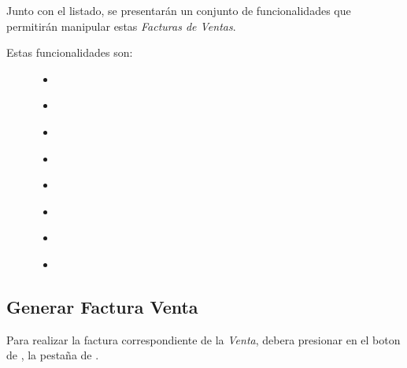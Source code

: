 \documentclass[a4paper,10pt,spanish]{sphinxmanual}
\begin{document}
Junto con el listado, se presentarán un conjunto de funcionalidades que permitirán manipular estas \emph{Facturas de Ventas}.
\begin{description}
\item[{Estas funcionalidades son:}] \leavevmode\begin{itemize}
\item {} 
{\hyperref[ventas:generar\string-factura\string-venta]{}}

\item {} 
{\hyperref[ventas:ver\string-facturas\string-emit]{}}

\item {} 
{\hyperref[ventas:imprimir]{}}

\item {} 
{\hyperref[ventas:ver\string-fecha\string-pago]{}}

\item {} 
{\hyperref[ventas:registrar\string-pago]{}}

\item {} 
{\hyperref[ventas:reportes]{}}

\item {} 
{\hyperref[ventas:formulario\string-busqueda\string-ventas]{}}

\item {} 
{\hyperref[ventas:formulario\string-busqueda\string-factemit]{}}

\end{itemize}

\end{description}


\subsection{Generar Factura Venta}
\label{ventas:generar-factura-venta}\label{ventas:id1}
Para realizar la factura correspondiente de la \emph{Venta}, debera presionar en el boton de , la pestaña de .

\end{document}
